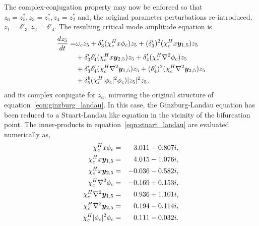 The complex-conjugation property may now be enforced so that $z_{6}=z^{*}_{5}, z_{3}=z^{*}_{1}, z_{4}=z^{*}_{2}$ and, the original parameter perturbations re-introduced, $z_{1} = \delta'_{3}, z_{2} = \delta'_{4}$. The resulting critical mode amplitude equation is
\begin{align}
	\label{eqn:stuart_landau}
	\begin{split}
	\dfrac{d z_{5}}{d t} =
	& \omega_{c}z_{5} + \delta'_{3}(\chi^{H}_{c}x\phi_{c})z_{5} +  				(\delta'_{3})^{2}(\chi^{H}_{c}x\boldsymbol{y}_{1,5})z_{5} \\
	& + \delta'_{3}\delta'_{4}(\chi^{H}_{c}x\boldsymbol{y}_{2,5})z_{5} + \delta'_{4}(\chi^{H}_{c}\nabla^{2}\phi_{c})z_{5} \\
	&  + \delta'_{3}\delta'_{4}(\chi^{H}_{c}\nabla^{2}\boldsymbol{y}_{1,5})z_{5} + (\delta'_{4})^{2}(\chi^{H}_{c}\nabla^{2}\boldsymbol{y}_{2,5})z_{5} \\
	& + \delta^{b}_{5}(\chi^{H}_{c}|\phi_{c}|^{2}\phi_{c})|z_{5}|^{2}z_{5},
	\end{split} 
\end{align}
and its complex conjugate for $z_{6}$, mirroring the original structure of equation~\eqref{eqn:ginzburg_landau}. In this case, the Ginzburg-Landau equation has been reduced to a Stuart-Landau like equation in the vicinity of the bifurcation point. The inner-products in equation~\eqref{eqn:stuart_landau} are evaluated numerically as,
\begin{align}
	\chi^{H}_{c}x\phi_{c} =&& 3.011 - 0.807i, \nonumber\\
	\chi^{H}_{c}x\boldsymbol{y}_{1,5} =&& 4.015 - 1.076i, \nonumber \\
	\chi^{H}_{c}x\boldsymbol{y}_{2,5} =&& -0.036 - 0.582i,  \nonumber \\
	\chi^{H}_{c}\nabla^{2}\phi_{c} =&& -0.169 + 0.153i, \nonumber \\
	\chi^{H}_{c}\nabla^{2}\boldsymbol{y}_{1,5} =&& 0.936 + 1.101i, \nonumber \\
	\chi^{H}_{c}\nabla^{2}\boldsymbol{y}_{2,5} =&& 0.194 - 0.114i, \nonumber \\
	\chi^{H}_{c}|\phi_{c}|^{2}\phi_{c} =&& 0.111 - 0.032i. \nonumber
\end{align}

